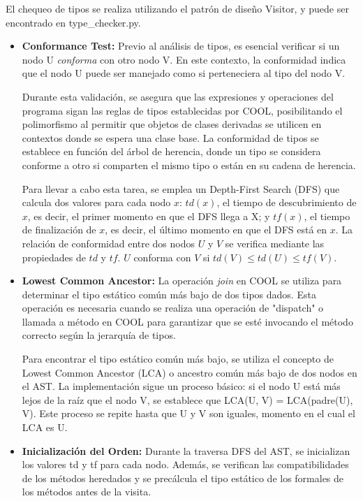 \documentclass[10pt]{article} %
\begin{document}
	El chequeo de tipos se realiza utilizando el patrón de diseño Visitor, y puede ser encontrado en type\_checker.py.
	
	\vspace{0.5em}
	\begin{itemize}
	\item \textbf{Conformance Test:} Previo al análisis de tipos, es esencial verificar si un nodo U \textit{conforma} con otro nodo V. En este contexto, la conformidad indica que el nodo U puede ser manejado como si perteneciera al tipo del nodo V.
	
	Durante esta validación, se asegura que las expresiones y operaciones del programa sigan las reglas de tipos establecidas por COOL, posibilitando el polimorfismo al permitir que objetos de clases derivadas se utilicen en contextos donde se espera una clase base. La conformidad de tipos se establece en función del árbol de herencia, donde un tipo se considera conforme a otro si comparten el mismo tipo o están en su cadena de herencia. 
	
	Para llevar a cabo esta tarea, se emplea un Depth-First Search (DFS) que calcula dos valores para cada nodo $x$: $td(x)$, el tiempo de descubrimiento de $x$, es decir, el primer momento en que el DFS llega a X; y $tf(x)$, el tiempo de finalización de $x$, es decir, el último momento en que el DFS está en $x$. La relación de conformidad entre dos nodos $U$ y $V$ se verifica mediante las propiedades de $td$ y $tf$. $U$ conforma con $V$ si $td(V) \leq td(U) \leq tf(V)$.
	
	\item \textbf{Lowest Common Ancestor:} La operación \textit{join} en COOL se utiliza para determinar el tipo estático común más bajo de dos tipos dados. Esta operación es necesaria cuando se realiza una operación de "dispatch" o llamada a método en COOL para garantizar que se esté invocando el método correcto según la jerarquía de tipos.
	
	Para encontrar el tipo estático común más bajo, se utiliza el concepto de Lowest Common Ancestor (LCA) o ancestro común más bajo de dos nodos en el AST. La implementación sigue un proceso básico: si el nodo U está más lejos de la raíz que el nodo V, se establece que LCA(U, V) = LCA(padre(U), V). Este proceso se repite hasta que U y V son iguales, momento en el cual el LCA es U. 
	
	\item \textbf{Inicialización del Orden:}
	Durante la traversa DFS del AST, se inicializan los valores td y tf para cada nodo. Además, se verifican las compatibilidades de los métodos heredados y se precálcula el tipo estático de los formales de los métodos antes de la visita.


\end{itemize}
\end{document}
